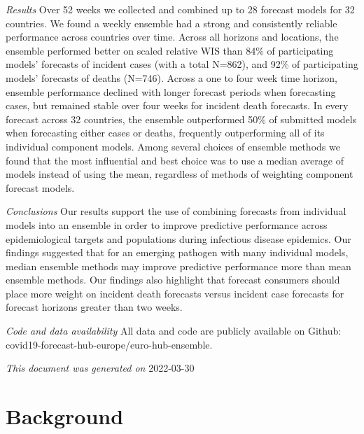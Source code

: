 \documentclass[
]{article}
\begin{document}
\emph{Results} Over 52 weeks we collected and combined up to 28 forecast
models for 32 countries. We found a weekly ensemble had a strong and
consistently reliable performance across countries over time. Across all
horizons and locations, the ensemble performed better on scaled relative
WIS than 84\% of participating models' forecasts of incident cases (with
a total N=862), and 92\% of participating models' forecasts of deaths
(N=746). Across a one to four week time horizon, ensemble performance
declined with longer forecast periods when forecasting cases, but
remained stable over four weeks for incident death forecasts. In every
forecast across 32 countries, the ensemble outperformed 50\% of
submitted models when forecasting either cases or deaths, frequently
outperforming all of its individual component models. Among several
choices of ensemble methods we found that the most influential and best
choice was to use a median average of models instead of using the mean,
regardless of methods of weighting component forecast models.

\emph{Conclusions} Our results support the use of combining forecasts
from individual models into an ensemble in order to improve predictive
performance across epidemiological targets and populations during
infectious disease epidemics. Our findings suggested that for an
emerging pathogen with many individual models, median ensemble methods
may improve predictive performance more than mean ensemble methods. Our
findings also highlight that forecast consumers should place more weight
on incident death forecasts versus incident case forecasts for forecast
horizons greater than two weeks.

\emph{Code and data availability} All data and code are publicly
available on Github: covid19-forecast-hub-europe/euro-hub-ensemble.

\emph{This document was generated on} 2022-03-30

\hypertarget{background}{%
\section{Background}\label{background}}
\end{document}

